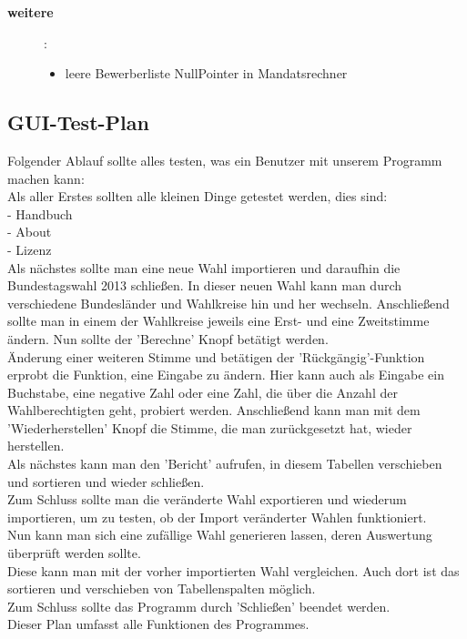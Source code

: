 \documentclass[12pt,a4paper,titlepage]{article}
\begin{document}
\begin{description}
\begin{itemize}
	
\end{itemize}

\item[\textbf {weitere}]:
\begin{itemize}
\item leere Bewerberliste 
NullPointer in Mandatsrechner
\end{itemize}

\end{description}

\subsection{GUI-Test-Plan}
Folgender Ablauf sollte alles testen, was ein Benutzer mit unserem Programm machen kann:\\
Als aller Erstes sollten alle kleinen Dinge getestet werden, dies sind:\\
 - Handbuch \\
 - About \\
 - Lizenz \\ 
Als nächstes sollte man eine neue Wahl importieren und daraufhin die Bundestagswahl 2013 schließen. In dieser neuen Wahl kann man durch verschiedene Bundesländer und Wahlkreise hin und her wechseln. Anschließend sollte man in einem der Wahlkreise
jeweils eine Erst- und eine Zweitstimme ändern. Nun sollte der 'Berechne' Knopf betätigt werden. \\
Änderung einer weiteren Stimme und betätigen der 'Rückgängig'-Funktion erprobt die Funktion, eine Eingabe zu ändern. Hier kann auch als Eingabe ein Buchstabe, eine negative Zahl oder eine Zahl, die über die Anzahl der Wahlberechtigten geht, probiert werden. Anschließend kann man mit dem 'Wiederherstellen' Knopf die Stimme, die man zurückgesetzt hat, wieder herstellen.\\
Als nächstes kann man den 'Bericht' aufrufen, in diesem Tabellen verschieben und sortieren und wieder schließen. \\
Zum Schluss sollte man die veränderte Wahl exportieren und wiederum importieren, um zu testen, ob der Import veränderter Wahlen funktioniert.\\
Nun kann man sich eine zufällige Wahl generieren lassen, deren Auswertung überprüft werden sollte. \\
Diese kann man mit der vorher importierten Wahl vergleichen. Auch dort ist das sortieren und verschieben von Tabellenspalten möglich. \\
Zum Schluss sollte das Programm durch 'Schließen' beendet werden. \\
Dieser Plan umfasst alle Funktionen des Programmes. \\
\end{document}
